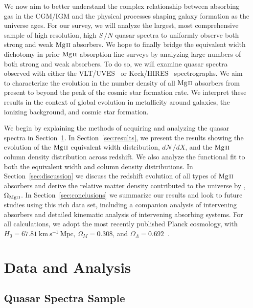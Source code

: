 \documentclass[iop,apj,numberedappendix,appendixfloats,twocolappendix]{emulateapj}
\begin{document}
We now aim to better understand the complex relationship between absorbing gas in the CGM/IGM and the physical processes shaping galaxy formation as the universe ages. For our survey, we will analyze the largest, most comprehensive sample of high resolution, high $S\,/N$ quasar spectra to uniformly observe both strong and weak ${\hbox{{\rm Mg}\kern 0.1em{\sc ii}}}$ absorbers. We hope to finally bridge the equivalent width dichotomy in prior ${\hbox{{\rm Mg}\kern 0.1em{\sc ii}}}$ absorption line surveys by analyzing large numbers of both strong and weak absorbers. To do so, we will examine quasar spectra observed with either the VLT/UVES~\citep{Dekker2000} or Keck/HIRES~\citep{Vogt1994} spectrographs. We aim to characterize the evolution in the number density of all ${\hbox{{\rm Mg}\kern 0.1em{\sc ii}}}$ absorbers from present to beyond the peak of the cosmic star formation rate. We interpret these results in the context of global evolution in metallicity around galaxies, the ionizing background, and cosmic star formation.

We begin by explaining the methods of acquiring and analyzing the quasar spectra in Section~\ref{sec:data}. In Section~\ref{sec:results}, we present the results showing the evolution of the ${\hbox{{\rm Mg}\kern 0.1em{\sc ii}}}$ equivalent width distribution, $d\mathcal{N}\!/dX$, and the ${\hbox{{\rm Mg}\kern 0.1em{\sc ii}}}$ column density distribution across redshift. We also analyze the functional fit to both the equivalent width and column density distributions. In Section~\ref{sec:discussion} we discuss the redshift evolution of all types of ${\hbox{{\rm Mg}\kern 0.1em{\sc ii}}}$ absorbers and derive the relative matter density contributed to the universe by {\MgII}, $\Omega_{\hbox{\scriptsize {\MgII}}}$. In Section~\ref{sec:conclusions} we summarize our results and look to future studies using this rich data set, including a companion analysis of intervening {\CIV} absorbers and detailed kinematic analysis of intervening absorbing systems. For all calculations, we adopt the most recently published Planck cosmology, with $H_0 = 67.81~\mathrm{km~s^{-1}~Mpc}$, $\Omega_M = 0.308$, and $\Omega_{\Lambda} = 0.692$~\citep{Planck2016}.


\section{Data and Analysis}
\label{sec:data}

\subsection{Quasar Spectra Sample}
\label{sec:sample}
\end{document}

